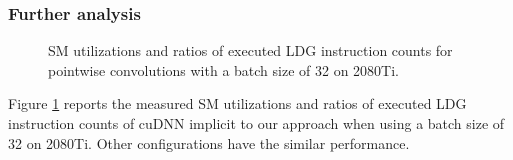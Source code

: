 \subsubsection{Further analysis}
\begin{figure}
    \centering
    \qquad
    
    \vspace{-2mm}
    \caption{SM utilizations and ratios of executed LDG instruction counts for pointwise convolutions with a batch size of 32 on 2080Ti.}
    \label{fig:pwinfo}
\end{figure}
Figure \ref{fig:pwinfo} reports the measured SM utilizations and ratios of executed LDG instruction counts of cuDNN implicit to our approach when using a batch size of 32 on 2080Ti. Other configurations have the similar performance. 

